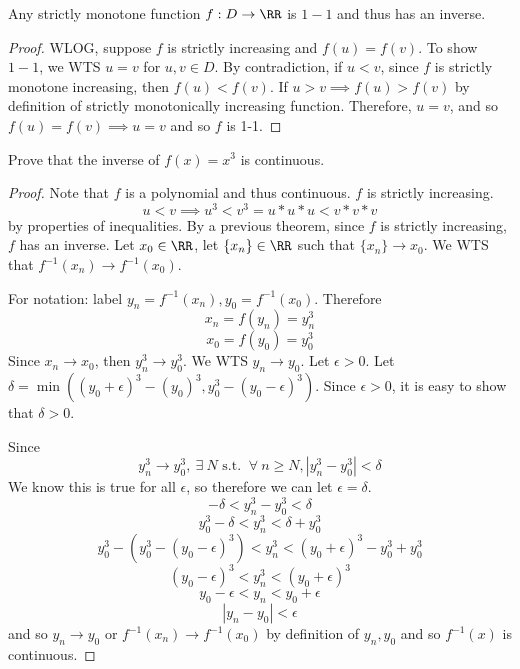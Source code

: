 \documentclass[12pt]{scrartcl}
\begin{document}
\begin{theorem}
  Any strictly monotone function $f: D \to \RR$ is $1-1$ and thus has an inverse. 

  \begin{proof}
    WLOG, suppose $f$ is strictly increasing and $f(u) = f(v)$. To show $1-1$, we WTS 
    $u = v$ for $u, v \in D$. By contradiction, if $u < v$, since $f$ is strictly monotone 
    increasing, then $f(u) < f(v)$. If $u > v \implies f(u) > f(v)$ by definition 
    of strictly monotonically increasing function. Therefore, $u = v$, and so 
    $f(u) = f(v) \implies u = v$ and so $f$ is 1-1.
  \end{proof}
\end{theorem}

\begin{example}
  Prove that the inverse of $f(x) = x^3$ is continuous.

  \begin{proof}
    Note that $f$ is a polynomial and thus continuous. $f$ is strictly increasing. 
    \[u < v \implies u^3 < v^3 = u * u * u < v * v * v\]
    by properties of inequalities. By a previous theorem, since $f$ is strictly increasing, 
    $f$ has an inverse. Let $x_0 \in \RR$, let $\{x_n\}\in \RR$ such that $\{x_n\} \to x_0$. 
    We WTS that $f^{-1}(x_n) \to f^{-1}(x_0)$. 

    \hfill

    For notation: label $y_n = f^{-1}(x_n), y_0 = f^{-1}(x_0)$. 
    Therefore
    \[x_n = f(y_n) = y_n^3 \]
    \[x_0 = f(y_0) = y_0^3\]
    Since $x_n \to x_0$, then $y_n^3 \to y_0^3$. We WTS $y_n \to y_0$. Let $\epsilon > 0$. 
    Let $\delta = \min((y_0+\epsilon)^3 - (y_0)^3, y_0^3 - (y_0 - \epsilon)^3)$. Since $\epsilon > 0$, 
    it is easy to show that $\delta > 0$. 

    Since 
    \[y_n^3 \to y_0^3, \ \exists \ N \text{ s.t. } \ \forall \ n \geq N, |y_n^3 - y_0^3| < \delta\]
    We know this is true for all $\epsilon$, so therefore we can let $\epsilon = \delta$. 
    \[-\delta < y_n^3 - y_0^3 < \delta \]
    \[y_0^3 - \delta < y_n^3 < \delta + y_0^3\]
    \[y_0^3 - (y_0^3 - (y_0 - \epsilon)^3) < y_n^3 < (y_0 + \epsilon)^3 - y_0^3 + y_0^3\]
    \[(y_0 - \epsilon)^3  < y_n^3 < (y_0 + \epsilon)^3\]
    \[y_0 - \epsilon < y_n < y_0 + \epsilon\]
    \[|y_n - y_0| < \epsilon\]
    and so $y_n \to y_0$ or $f^{-1}(x_n) \to f^{-1}(x_0)$ by definition of $y_n, y_0$ and so $f^{-1}(x)$ is continuous.
  \end{proof}
\end{example}
\end{document}
